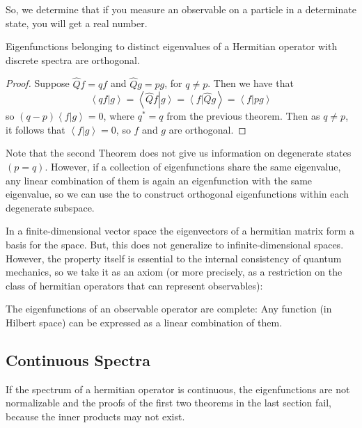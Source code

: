 \documentclass[12pt, a4paper, oneside, openright, titlepage]{book}
\newcommand{\braket}[2]{\left\langle#1\right\vert\left.#2\right\rangle}
\begin{document}
So, we determine that if you measure an observable on a particle in a determinate state, you will get a real number.

\begin{thm}
    Eigenfunctions belonging to distinct eigenvalues of a Hermitian operator with discrete spectra are orthogonal.
\end{thm}
\begin{proof}
    Suppose $\hat{Q}f = qf$ and $\hat{Q}g = pg$, for $q \neq p$. Then we have that $$\braket{qf}{g} = \braket{\hat{Q}f}{g} = \braket{f}{\hat{Q}g} = \braket{f}{pg}$$ so $(q-p)\braket{f}{g} = 0$, where $q^* = q$ from the previous theorem. Then as $q \neq p$, it follows that $\braket{f}{g} = 0$, so $f$ and $g$ are orthogonal.
\end{proof}

Note that the second Theorem does not give us information on degenerate states $(p = q)$. However, if a collection of eigenfunctions share the same eigenvalue, any linear combination of them is again an eigenfunction with the same eigenvalue, so we can use the  to construct orthogonal eigenfunctions within each degenerate subspace.

In a finite-dimensional vector space the eigenvectors of a hermitian matrix form a basis for the space. But, this does not generalize to infinite-dimensional spaces. However, the property itself is essential to the internal consistency of quantum mechanics, so we take it as an axiom (or more precisely, as a restriction on the class of hermitian operators that can represent observables): 

\begin{axi}
    The eigenfunctions of an observable operator are complete: Any function (in Hilbert space) can be expressed as a linear combination of them.
\end{axi}

\subsection{Continuous Spectra}

If the spectrum of a hermitian operator is continuous, the eigenfunctions are not normalizable and the proofs of the first two theorems in the last section fail, because the inner products may not exist.
\end{document}
